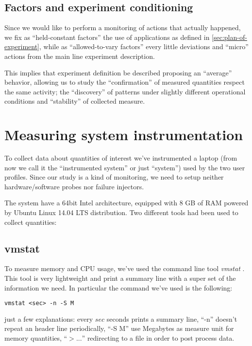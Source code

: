 \documentclass[10pt,a4paper]{article}
\begin{document}
    \subsection{Factors and experiment conditioning}
    Since we would like to perform a monitoring of actions that
    actually happened, we fix as ``held-constant factors'' the use of
    applications as defined in \autoref{sec:plan-of-experiment}, while
    as ``allowed-to-vary factors'' every little deviations and
    ``micro'' actions from the main line experiment description. 

    This implies that experiment definition be described proposing an
    ``average'' behavior, allowing us to study the ``confirmation'' of
    measured quantities respect the same activity; the ``discovery''
    of patterns under slightly different operational conditions and
    ``stability'' of collected measure.

    \section{Measuring system instrumentation}
    To collect data about quantities of interest we've instrumented a
    laptop (from now we call it the ``instrumented system'' or just
    ``system'') used by the two user profiles. Since our study is a
    kind of monitoring, we need to setup neither hardware/software
    probes nor failure injectors.

    The system have a 64bit Intel architecture, equipped with 8 GB of
    RAM powered by Ubuntu Linux 14.04 LTS distribution. Two different
    tools had been used to collect quantities:

    \subsection{vmstat} 
    To measure memory and CPU usage, we've used the command line tool
    \emph{vmstat} \cite{vmstat}. This tool is very lightweight and
    print a summary line with a super set of the information we
    need. In particular the command we've used is the following:
\begin{verbatim}
vmstat <sec> -n -S M 
\end{verbatim}
    just a few explanations: every $sec$ seconds prints a summary line,
    ``-n'' doesn't repeat an header line periodically, ``-S M'' use
    Megabytes as measure unit for memory quantities, ``$> ...$''
    redirecting to a file in order to post process data. 
\end{document}
